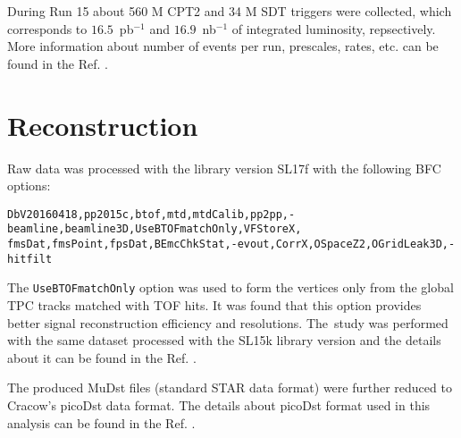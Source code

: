 During Run 15 about 560 M CPT2 and 34 M SDT triggers were collected, which corresponds to $16.5$~pb$^{-1}$ and $16.9$~nb$^{-1}$ of integrated luminosity, repsectively. More information about number of events per run, prescales, rates, etc. can be found in the Ref. \cite{runlog,runlog1}.
\section{Reconstruction}
Raw data was processed with the library version SL17f with the following BFC options:
\vspace{1em}

\noindent\texttt{DbV20160418,pp2015c,btof,mtd,mtdCalib,pp2pp,-beamline,beamline3D,UseBTOFmatchOnly,VFStoreX, \newline fmsDat,fmsPoint,fpsDat,BEmcChkStat,-evout,CorrX,OSpaceZ2,OGridLeak3D,-hitfilt}
\vspace{1em}

The \texttt{UseBTOFmatchOnly} option was used to form the vertices only from the global TPC tracks matched with TOF hits. It was found that this option provides better signal reconstruction efficiency and resolutions. The~study was performed with the same dataset processed with the SL15k library version and the details about it can be found in the Ref. \cite{rvrtxmtg}. 

The produced MuDst files (standard STAR data format) were further reduced to Cracow's picoDst data format. The details about picoDst format used in this analysis can be found in the Ref. \cite{picoDst}.
